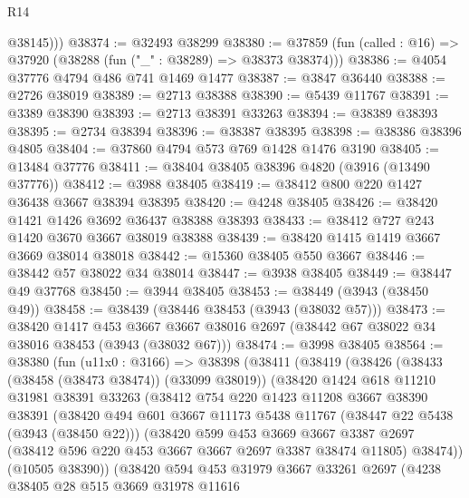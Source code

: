 \begin{lexlean}{R14}
\begin{coremodule}
          @38145)))
@38374 := @32493 @38299
@38380 := @37859 (fun (called : @16) => @37920 (@38288 (fun ("_" : @38289) => @38373 @38374)))
@38386 := @4054 @37776 @4794 @486 @741 @1469 @1477
@38387 := @3847 @36440
@38388 := @2726 @38019
@38389 := @2713 @38388
@38390 := @5439 @11767
@38391 := @3389 @38390
@38393 := @2713 @38391 @33263
@38394 := @38389 @38393
@38395 := @2734 @38394
@38396 := @38387 @38395
@38398 := @38386 @38396 @4805
@38404 := @37860 @4794 @573 @769 @1428 @1476 @3190
@38405 := @13484 @37776
@38411 := @38404 @38405 @38396 @4820 (@3916 (@13490 @37776))
@38412 := @3988 @38405
@38419 := @38412 @800 @220 @1427 @36438 @3667 @38394 @38395
@38420 := @4248 @38405
@38426 := @38420 @1421 @1426 @3692 @36437 @38388 @38393
@38433 := @38412 @727 @243 @1420 @3670 @3667 @38019 @38388
@38439 := @38420 @1415 @1419 @3667 @3669 @38014 @38018
@38442 := @15360 @38405 @550 @3667
@38446 := @38442 @57 @38022 @34 @38014
@38447 := @3938 @38405
@38449 := @38447 @49 @37768
@38450 := @3944 @38405
@38453 := @38449 (@3943 (@38450 @49))
@38458 := @38439 (@38446 @38453 (@3943 (@38032 @57)))
@38473 := @38420
    @1417
    @453
    @3667
    @3667
    @38016
    @2697
    (@38442 @67 @38022 @34 @38016 @38453 (@3943 (@38032 @67)))
@38474 := @3998 @38405
@38564 := @38380
    (fun (u11x0 : @3166) =>
    @38398
      (@38411
        (@38419
          (@38426
            (@38433 (@38458 (@38473 @38474)) (@33099 @38019))
            (@38420
              @1424
              @618
              @11210
              @31981
              @38391
              @33263
              (@38412
                @754
                @220
                @1423
                @11208
                @3667
                @38390
                @38391
                (@38420
                  @494
                  @601
                  @3667
                  @11173
                  @5438
                  @11767
                  (@38447 @22 @5438 (@3943 (@38450 @22)))
                  (@38420
                    @599
                    @453
                    @3669
                    @3667
                    @3387
                    @2697
                    (@38412 @596 @220 @453 @3667 @3667 @2697 @3387 @38474 @11805)
                    @38474))
                (@10505 @38390))
              (@38420
                @594
                @453
                @31979
                @3667
                @33261
                @2697
                (@4238
                  @38405
                  @28
                  @515
                  @3669
                  @31978
                  @11616

\end{coremodule}
\end{lexlean}
